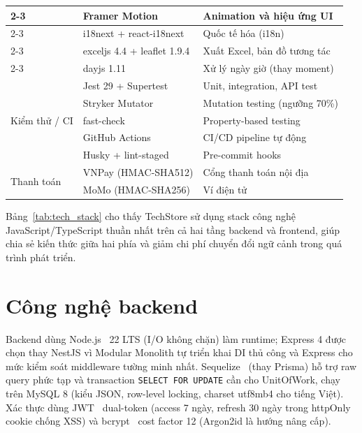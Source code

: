 \begin{table}[H]
\begin{tabular}{|l|l|p{6cm}|}
    \cline{2-3}
    & Framer Motion & Animation và hiệu ứng UI \\
    \cline{2-3}
    & i18next + react-i18next & Quốc tế hóa (i18n) \\
    \cline{2-3}
    & exceljs 4.4 + leaflet 1.9.4 & Xuất Excel, bản đồ tương tác \\
    \cline{2-3}
    & dayjs 1.11 & Xử lý ngày giờ (thay moment) \\
    \hline
    \multirow{5}{*}{Kiểm thử / CI} & Jest 29 + Supertest & Unit, integration, API test \\
    \cline{2-3}
    & Stryker Mutator & Mutation testing (ngưỡng 70\%) \\
    \cline{2-3}
    & fast-check & Property-based testing \\
    \cline{2-3}
    & GitHub Actions & CI/CD pipeline tự động \\
    \cline{2-3}
    & Husky + lint-staged & Pre-commit hooks \\
    \hline
    \multirow{2}{*}{Thanh toán} & VNPay (HMAC-SHA512) & Cổng thanh toán nội địa \\
    \cline{2-3}
    & MoMo (HMAC-SHA256) & Ví điện tử \\
    \hline
  \end{tabular}
  \normalsize
\end{table}

Bảng~\ref{tab:tech_stack} cho thấy TechStore sử dụng stack công nghệ JavaScript/TypeScript thuần nhất trên cả hai tầng backend và frontend, giúp chia sẻ kiến thức giữa hai phía và giảm chi phí chuyển đổi ngữ cảnh trong quá trình phát triển.

\section{Công nghệ backend}
\label{sec:c2_backend_tech}

Backend dùng Node.js~\cite{tilkov2010node} 22 LTS (I/O không chặn) làm runtime; Express 4 được chọn thay NestJS vì Modular Monolith tự triển khai DI thủ công và Express cho mức kiểm soát middleware tường minh nhất. Sequelize~\cite{sequelize_docs} (thay Prisma) hỗ trợ raw query phức tạp và transaction \texttt{SELECT FOR UPDATE} cần cho UnitOfWork, chạy trên MySQL 8 (kiểu JSON, row-level locking, charset utf8mb4 cho tiếng Việt). Xác thực dùng JWT~\cite{jones2015jwt} dual-token (access 7 ngày, refresh 30 ngày trong httpOnly cookie chống XSS) và bcrypt~\cite{provos1999bcrypt} cost factor 12 (Argon2id là hướng nâng cấp).

